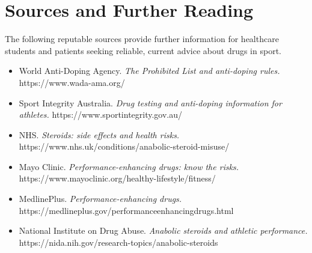 \section*{Sources and Further Reading}
The following reputable sources provide further information for healthcare students and patients seeking reliable, current advice about drugs in sport.
\begin{itemize}
    \item World Anti-Doping Agency. \textit{The Prohibited List and anti-doping rules.} https://www.wada-ama.org/
    \item Sport Integrity Australia. \textit{Drug testing and anti-doping information for athletes.} https://www.sportintegrity.gov.au/
    \item NHS. \textit{Steroids: side effects and health risks.} https://www.nhs.uk/conditions/anabolic-steroid-misuse/
    \item Mayo Clinic. \textit{Performance-enhancing drugs: know the risks.} https://www.mayoclinic.org/healthy-lifestyle/fitness/
    \item MedlinePlus. \textit{Performance-enhancing drugs.} https://medlineplus.gov/performanceenhancingdrugs.html
    \item National Institute on Drug Abuse. \textit{Anabolic steroids and athletic performance.} https://nida.nih.gov/research-topics/anabolic-steroids
\end{itemize}
